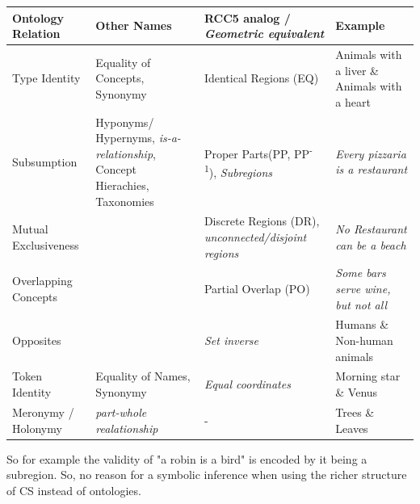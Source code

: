 \begin{tabularx}{1.05\textwidth}{P{0.16\textwidth}|P{0.25\textwidth}|P{0.25\textwidth}|X}
    Ontology Relation & Other Names        & RCC5 \cite{Cohn1997a} analog / \textit{Geometric equivalent} & Example \\ \midrule

    Type Identity     & {\scriptsize Equality of Concepts, Synonymy } & Identical Regions (EQ)      & Animals with a liver \& Animals with a heart \\ 

    Subsumption       & {\scriptsize Hyponyms/ Hypernyms, \textit{is-a-relationship}, Concept Hierachies, Taxonomies }
                                           & Proper Parts(PP, PP\textsuperscript{-1}), \textit{Subregions}
                                                                          & \textit{Every pizzaria is a restaurant} \\  
    
    Mutual 
    Exclusiveness     &                    & Discrete Regions (DR), \textit{unconnected/disjoint regions}
                                                                          & \textit{No Restaurant can be a beach} \\  

    Overlapping 
    Concepts          &                    & Partial Overlap (PO)         & \textit{Some bars serve wine, but not all} \\  

    Opposites         &                    & \textit{Set inverse}         & Humans \& Non-human animals \\ 

    Token Identity    & {\scriptsize Equality of Names, Synonymy } & \textit{Equal coordinates}   & Morning star \& Venus \\ 
    Meronymy / Holonymy & {\scriptsize \textit{part-whole realationship} }& -             & Trees \& Leaves
\end{tabularx}

\vspace{4ex}


So for example the validity of "a robin is a bird" is encoded by it being a subregion. So, no reason for a symbolic inference when using the richer structure of CS instead of ontologies.

